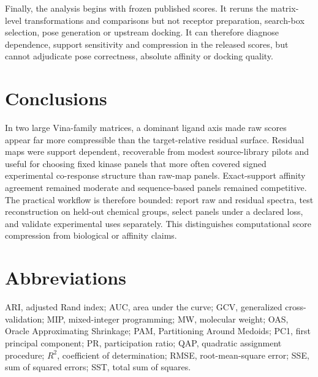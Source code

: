 \documentclass[11pt]{article}
\begin{document}
Finally, the analysis begins with frozen published scores. It reruns the
matrix-level transformations and comparisons but not receptor preparation,
search-box selection, pose generation or upstream docking. It can therefore
diagnose dependence, support sensitivity and compression in the released
scores, but cannot adjudicate pose correctness, absolute affinity or docking
quality.

\section{Conclusions}

In two large Vina-family matrices, a dominant ligand axis made raw scores appear
far more compressible than the target-relative residual surface. Residual maps
were support dependent, recoverable from modest source-library pilots and useful
for choosing fixed kinase panels that more often covered signed experimental
co-response structure than raw-map panels. Exact-support affinity agreement
remained moderate and sequence-based panels remained competitive. The practical
workflow is therefore bounded: report raw and residual spectra, test
reconstruction on held-out chemical groups, select panels under a declared loss,
and validate experimental uses separately. This distinguishes computational
score compression from biological or affinity claims.

\section*{Abbreviations}

ARI, adjusted Rand index; AUC, area under the curve; GCV, generalized
cross-validation; MIP, mixed-integer programming; MW, molecular weight; OAS,
Oracle Approximating Shrinkage; PAM, Partitioning Around Medoids; PC1, first
principal component; PR, participation ratio; QAP, quadratic assignment
procedure; $R^2$, coefficient of determination; RMSE, root-mean-square error;
SSE, sum of squared errors; SST, total sum of squares.




\end{document}
